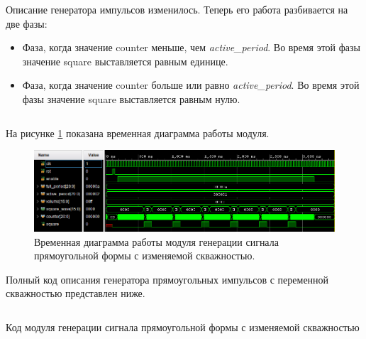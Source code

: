 Описание генератора импульсов изменилось. Теперь его работа разбивается на две фазы:
\begin{itemize}
	\item Фаза, когда значение counter меньше, чем \textit{active\_period}. Во время этой фазы значение square выставляется равным единице.
	\item Фаза, когда значение counter больше или равно \textit{active\_period}. Во время этой фазы значение square выставляется равным нулю.
\end{itemize}

% 	

\begin{listing}[H]
	\inputminted[firstline=25, lastline=36]{SystemVerilog}{code_examples/lab_7/square_duty_cycle.sv}
\end{listing}


На рисунке \ref{lab7:pic6} показана временная диаграмма работы модуля.

\begin{figure}[H]
	\centering
	\includegraphics [width=1\textwidth] {images/lab_7/square_simulate2.PNG}
	\caption{Временная диаграмма работы модуля генерации сигнала прямоугольной формы с изменяемой скважностью.}
	\label{lab7:pic6}
\end{figure}

Полный код описания генератора прямоугольных импульсов с переменной скважностью представлен ниже.


% 	


\begin{listing}[H]
	\inputminted{SystemVerilog}{code_examples/lab_7/square_duty_cycle.sv}
	\caption{Код модуля генерации сигнала прямоугольной формы с изменяемой скважностью}
\end{listing}



